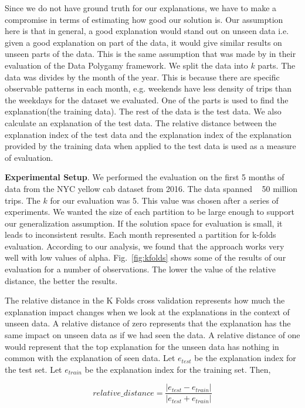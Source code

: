 Since we do not have ground truth for our explanations, we have to make a compromise in terms of estimating how good our solution is. Our assumption here is that in general, a good explanation would stand out on unseen data i.e. given a good explanation on part of the data, it would give similar results on unseen parts of the data. This is the same assumption that was made by \cite{chirigati2016data} in their evaluation of the Data Polygamy framework. We split the data into $k$ parts. The data was divides by the month of the year. This is because there are specific observable patterns in each month, e.g. weekends have less density of trips than the weekdays for the dataset we evaluated. One of the parts is used to find the explanation(the training data). The rest of the data is the test data. We also calculate an explanation of the test data. The relative distance between the explanation index of the test data and the explanation index of the explanation provided by the training data when applied to the test data is used as a measure of evaluation.



\textbf{Experimental Setup}. We performed the evaluation on the first 5 months of data from the NYC yellow cab dataset from 2016. The data spanned ~ 50 million trips. The $k$ for our evaluation was $5$. This value was chosen after a series of experiments. We wanted the size of each partition to be large enough to support our generalization assumption. If the solution space for evaluation is small, it leads to inconsistent results. Each month represented a partition for k-folds evaluation. According to our analysis, we found that the approach works very well with low values of alpha. Fig.~\ref{fig:kfolds} shows some of the results of our evaluation for a number of observations. The lower the value of the relative distance, the better the results.

The relative distance in the K Folds cross validation represents how much the explanation impact changes when we look at the explanations in the context of unseen data. A relative distance of zero represents that the explanation has the same impact on unseen data as if we had seen the data. A relative distance of one would represent that the top explanation for the unseen data has nothing in common with the explanation of seen data. Let $e_{test}$ be the explanation index for the test set. Let $e_{train}$ be the explanation index for the training set. Then,

$$relative\_distance = \frac{|e_{test}-e_{train}|}{|e_{test}+e_{train}|}$$

